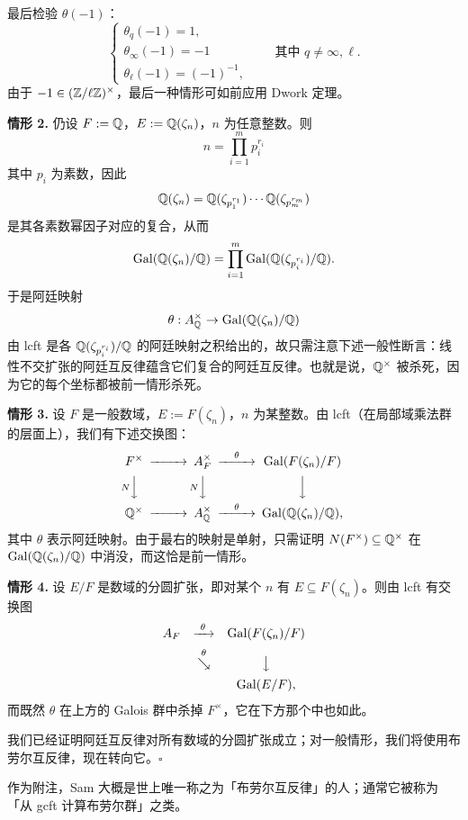 最后检验 $\theta(-1)$：
\[
\begin{cases}
\theta_q(-1)=1,\\
\theta_\infty(-1)=-1\\
\theta_\ell(-1)=(-1)^{-1},
\end{cases}
\qquad\text{其中 } q\ne\infty,\ell.
\]
由于 $-1\in(\mathbb{Z}/\ell\mathbb{Z})^\times$，最后一种情形可如前应用 Dwork 定理。

\textbf{情形 2.} 仍设 $F:=\mathbb{Q}$，$E:=\mathbb{Q}(\zeta_n)$，$n$ 为任意整数。则
\[
n=\prod_{i=1}^m p_i^{r_i}
\]
其中 $p_i$ 为素数，因此
\[
\mathbb{Q}(\zeta_n)=\mathbb{Q}(\zeta_{p_1^{r_1}})\cdots\mathbb{Q}(\zeta_{p_m^{r_m}})
\]
是其各素数幂因子对应的复合，从而
\[
\operatorname{Gal}(\mathbb{Q}(\zeta_n)/\mathbb{Q})=\prod_{i=1}^m\operatorname{Gal}(\mathbb{Q}(\zeta_{p_i^{r_i}})/\mathbb{Q}).
\]
于是阿廷映射
\[
\theta:A_{\mathbb{Q}}^\times\to\operatorname{Gal}(\mathbb{Q}(\zeta_n)/\mathbb{Q})
\]
由 lcft 是各 $\mathbb{Q}(\zeta_{p_i^{r_i}})/\mathbb{Q}$ 的阿廷映射之积给出的，故只需注意下述一般性断言：线性不交扩张的阿廷互反律蕴含它们复合的阿廷互反律。也就是说，$\mathbb{Q}^\times$ 被杀死，因为它的每个坐标都被前一情形杀死。

\textbf{情形 3.} 设 $F$ 是一般数域，$E:=F(\zeta_n)$，$n$ 为某整数。由 lcft（在局部域乘法群的层面上），我们有下述交换图：
\[
\begin{CD}
F^\times @>>> A_F^\times @>{\theta}>> \Gal(F(\zeta_n)/F)\\
@V{N}VV @V{N}VV @VVV\\
\Q^\times @>>> A_\Q^\times @>{\theta}>> \Gal(\Q(\zeta_n)/\Q),
\end{CD}
\]
其中 $\theta$ 表示阿廷映射。由于最右的映射是单射，只需证明 $N(F^\times)\subseteq\mathbb{Q}^\times$ 在 $\operatorname{Gal}(\mathbb{Q}(\zeta_n)/\mathbb{Q})$ 中消没，而这恰是前一情形。

\textbf{情形 4.} 设 $E/F$ 是数域的分圆扩张，即对某个 $n$ 有 $E\subseteq F(\zeta_n)$。则由 lcft 有交换图
\[
\begin{array}{ccc}
A_F & \xrightarrow{\ \theta\ } & \operatorname{Gal}(F(\zeta_n)/F)\\[5pt]
& \stackrel{\theta}{\searrow} & \big\downarrow\\[5pt]
& & \operatorname{Gal}(E/F),
\end{array}
\]
而既然 $\theta$ 在上方的 Galois 群中杀掉 $F^\times$，它在下方那个中也如此。

我们已经证明阿廷互反律对所有数域的分圆扩张成立；对一般情形，我们将使用布劳尔互反律，现在转向它。\hfill$\square$

作为附注，Sam 大概是世上唯一称之为「布劳尔互反律」的人；通常它被称为「从 gcft 计算布劳尔群」之类。

